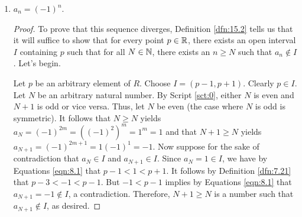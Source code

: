 \documentclass[../main.tex]{subfiles}
\begin{document}
\begin{exercise}
\begin{enumerate}[label={(\alph*)},ref={\theexercise\alph*}]
        \begin{proof}
            To prove that this sequence converges with limit $\lim_{n\to\infty}a_n=0$, Definitions \ref{dfn:15.5} and \ref{dfn:15.2} tell us that it will suffice to show that for every open interval $I$ containing 0, there exists $N\in\N$ such that if $n\geq N$, then $a_n\in I$. Let's begin.\par
            Let $I$ be an arbitrary interval containing 0. By Lemma \ref{lem:8.10}, there exists a region $(a,b)$ containing 0 such that $(a,b)\subset I$. By Corollary \ref{cly:6.12}, there exists a natural number $N$ such that $\frac{1}{b}<N$. Choose this $N$ to be our $N$. Now let $n$ be an arbitrary natural number such that $n\geq N$. It follows that $\frac{1}{b}<n$. Thus, since $0<b$ and $0<n$, we have by consecutive applications of Lemma \ref{lem:7.24} that $0<\frac{1}{n}<b$. Consequently, since we also know that $a<0$ and $a_n=\frac{1}{n}$, we have by transitivity and substitution that $a<a_n<b$. It follows by Equations \ref{eqn:8.1} that $a_n\in(a,b)$. Therefore, by Definition \ref{dfn:1.3}, $a_n\in I$, as desired.
        \end{proof}
        \item \label{exr:15.6d}$a_n=(-1)^n$.
        \begin{proof}
            To prove that this sequence diverges, Definition \ref{dfn:15.2} tells us that it will suffice to show that for every point $p\in\mathbb{R}$, there exists an open interval $I$ containing $p$ such that for all $N\in\N$, there exists an $n\geq N$ such that $a_n\notin I$. Let's begin.\par
            Let $p$ be an arbitrary element of $R$. Choose $I=(p-1,p+1)$. Clearly $p\in I$. Let $N$ be an arbitrary natural number. By Script \ref{sct:0}, either $N$ is even and $N+1$ is odd or vice versa. Thus, let $N$ be even (the case where $N$ is odd is symmetric). It follows that $N\geq N$ yields $a_N=(-1)^{2m}=((-1)^2)^m=1^m=1$ and that $N+1\geq N$ yields $a_{N+1}=(-1)^{2m+1}=1(-1)^1=-1$. Now suppose for the sake of contradiction that $a_N\in I$ and $a_{N+1}\in I$. Since $a_N=1\in I$, we have by Equations \ref{eqn:8.1} that $p-1<1<p+1$. It follows by Definition \ref{dfn:7.21} that $p-3<-1<p-1$. But $-1<p-1$ implies by Equations \ref{eqn:8.1} that $a_{N+1}=-1\notin I$, a contradiction. Therefore, $N+1\geq N$ is a number such that $a_{N+1}\notin I$, as desired.
        \end{proof}
    \end{enumerate}
\end{exercise}
\end{document}
